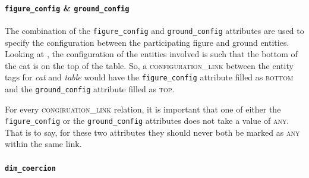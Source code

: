 \documentclass[11pt]{article}
\newenvironment{note}
{\list{}
 {\setlength
  {\itemindent}
  {\listparindent}}
   \item[\textbf{Note:}]\relax}
{\endlist}
\begin{document}
\paragraph{\texttt{figure\_config} \& \texttt{ground\_config}} %
\label{par:figure_ground_config}
The combination of the \texttt{figure\_config} and \texttt{ground\_config} attributes are used to specify the configuration between the participating figure and ground entities. Looking at , the configuration of the entities involved is such that the bottom of the cat is on the top of the table. So, a \textsc{configuration\_link} between the entity tags for \emph{cat} and \emph{table} would have the \texttt{figure\_config} attribute filled as \textsc{bottom} and the \texttt{ground\_config} attribute filled as \textsc{top}.

\begin{note}
For every \textsc{congiruation\_link} relation, it is important that one of either the \texttt{figure\_config} or the \texttt{ground\_config} attributes does not take a value of \textsc{any}. That is to say, for these two attributes they should never both be marked as \textsc{any} within the same link.
\end{note}

\label{ex:ground_requirement}


\paragraph{\texttt{dim\_coercion}} %
\label{par:dim_coercion}
\end{document}
